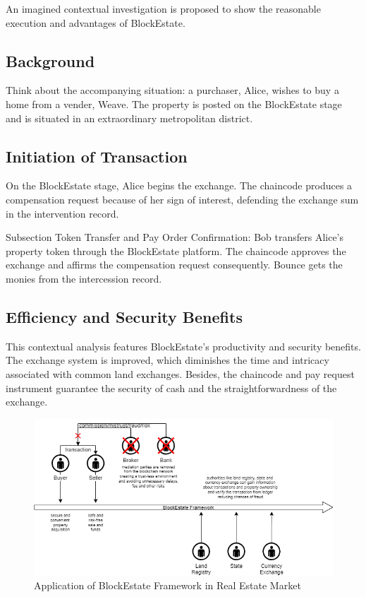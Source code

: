 \documentclass[3p,times]{elsarticle}
\begin{document}
An imagined contextual investigation is proposed to show the reasonable execution and advantages of BlockEstate.

\subsection{Background}

Think about the accompanying situation: a purchaser, Alice, wishes to buy a home from a vender, Weave. The property is posted on the BlockEstate stage \cite{li2019blockchain} and is situated in an extraordinary metropolitan district.

\subsection{Initiation of Transaction}

On the BlockEstate stage, Alice begins the exchange. The chaincode produces a compensation request because of her sign of interest, defending the exchange sum in the intervention record.

Subsection Token Transfer and Pay Order Confirmation: Bob transfers Alice's property token through the BlockEstate platform. The chaincode approves the exchange and affirms the compensation request consequently. Bounce \cite{hutson2023architecting} gets the monies from the intercession record.

\subsection{Efficiency and Security Benefits}

This contextual analysis features BlockEstate's productivity and security benefits. The exchange system is improved, which diminishes the time and intricacy associated with common land exchanges. Besides, the chaincode and pay request instrument \cite{bhatia2019exploration} guarantee the security of cash and the straightforwardness of the exchange.

\begin{figure}[H]
    \centering
    \includegraphics[width=1.0\linewidth]{images/use case.drawio.png}
    \caption{Application of BlockEstate Framework in Real Estate Market}
    \label{fig:fig3}
\end{figure}
\end{document}
